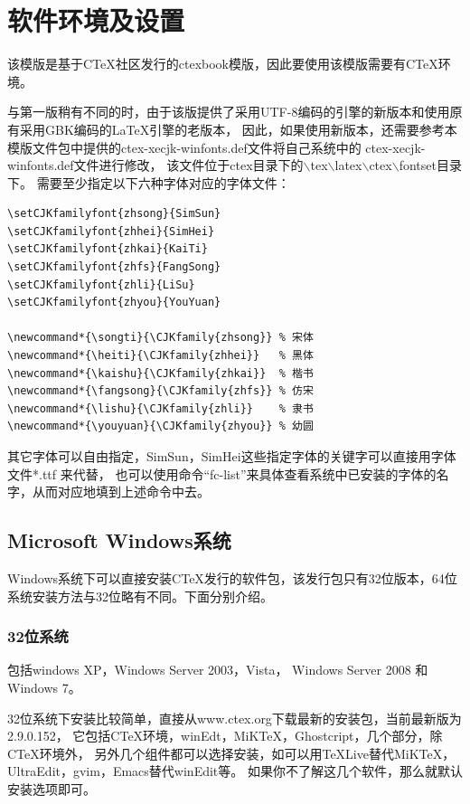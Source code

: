 \chapter{软件环境及设置}

该模版是基于CTeX社区发行的ctexbook模版，因此要使用该模版需要有CTeX环境。

与第一版稍有不同的时，由于该版提供了采用UTF-8编码的\XeTeX{}引擎的新版本和使用原有采用GBK编码的\LaTeX{}引擎的老版本，
因此，如果使用新版本，还需要参考本模版文件包中提供的ctex-xecjk-winfonts.def文件将自己系统中的
ctex-xecjk-winfonts.def文件进行修改，
该文件位于ctex目录下的$\backslash$tex$\backslash$latex$\backslash$ctex$\backslash$fontset目录下。
需要至少指定以下六种字体对应的字体文件：
\begin{verbatim}
\setCJKfamilyfont{zhsong}{SimSun}
\setCJKfamilyfont{zhhei}{SimHei}
\setCJKfamilyfont{zhkai}{KaiTi}
\setCJKfamilyfont{zhfs}{FangSong}
\setCJKfamilyfont{zhli}{LiSu}
\setCJKfamilyfont{zhyou}{YouYuan}

\newcommand*{\songti}{\CJKfamily{zhsong}} % 宋体
\newcommand*{\heiti}{\CJKfamily{zhhei}}   % 黑体
\newcommand*{\kaishu}{\CJKfamily{zhkai}}  % 楷书
\newcommand*{\fangsong}{\CJKfamily{zhfs}} % 仿宋
\newcommand*{\lishu}{\CJKfamily{zhli}}    % 隶书
\newcommand*{\youyuan}{\CJKfamily{zhyou}} % 幼圆
\end{verbatim}

其它字体可以自由指定，SimSun，SimHei这些指定字体的关键字可以直接用字体文件*.ttf 来代替，
也可以使用命令“fc-list”来具体查看系统中已安装的字体的名字，从而对应地填到上述命令中去。


\section{Microsoft Windows系统}

Windows系统下可以直接安装CTeX发行的软件包，该发行包只有32位版本，64位系统安装方法与32位略有不同。下面分别介绍。

\subsection{32位系统}

包括windows XP，Windows Server 2003，Vista， Windows Server 2008 和 Windows 7。

32位系统下安装比较简单，直接从www.ctex.org下载最新的安装包，当前最新版为2.9.0.152，
它包括CTeX环境，winEdt，MiKTeX，Ghostcript，几个部分，除CTeX环境外，
另外几个组件都可以选择安装，如可以用TeXLive替代MiKTeX，UltraEdit，gvim，Emacs替代winEdit等。
如果你不了解这几个软件，那么就默认安装选项即可。

